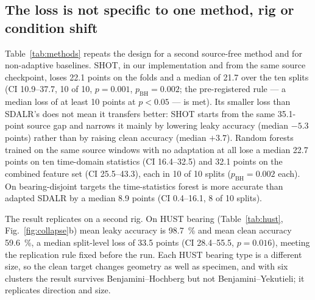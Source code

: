 \subsection{The loss is not specific to one method, rig or condition shift}
\label{sec:res-second}





Table~\ref{tab:methods} repeats the design for a second source-free method and for non-adaptive baselines. SHOT, in our
implementation and from the same source checkpoint, loses 22.1 points on the folds and a median of 21.7 over the ten splits
(CI 10.9--37.7, 10 of 10, $p = 0.001$, $p_{\mathrm{BH}} = 0.002$; the pre-registered rule --- a median loss of at least 10
points at $p < 0.05$ --- is met). Its smaller loss than SDALR's does not mean it transfers better: SHOT starts from the same
35.1-point source gap and narrows it mainly by lowering leaky accuracy (median $-5.3$ points) rather than by raising clean
accuracy (median $+3.7$). Random forests \cite{pedregosa2011sklearn} trained on the same source windows with no adaptation at all lose a median 22.7
points on ten time-domain statistics (CI 16.4--32.5) and 32.1 points on the combined feature set (CI 25.5--43.3), each in 10
of 10 splits ($p_{\mathrm{BH}} = 0.002$ each). On bearing-disjoint targets the time-statistics forest is more accurate than
adapted SDALR by a median 8.9 points (CI 0.4--16.1, 8 of 10 splits).

The result replicates on a second rig. On HUST bearing (Table~\ref{tab:hust}, Fig.~\ref{fig:collapse}b) mean leaky accuracy
is \SI{98.7}{\percent} and mean clean accuracy \SI{59.6}{\percent}, a median split-level loss of 33.5 points (CI 28.4--55.5,
$p=0.016$), meeting the replication rule fixed before the run. Each HUST bearing type is a different size, so the clean target
changes geometry as well as specimen, and with six clusters the result survives Benjamini--Hochberg but not
Benjamini--Yekutieli; it replicates direction and size.

